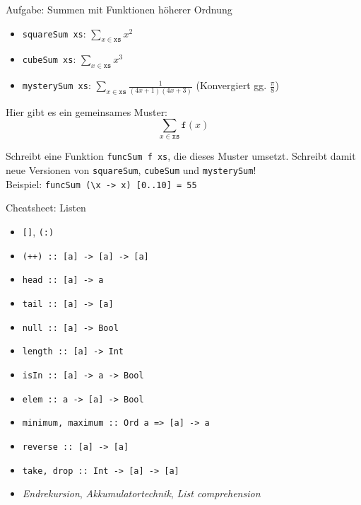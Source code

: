 \documentclass{beamer}
\begin{document}
\begin{frame}{Aufgabe: Summen mit Funktionen höherer Ordnung}
  \begin{itemize}
    \item \texttt{squareSum xs}: $\sum\limits_{x \in \texttt{xs}} x^2$
    \item \texttt{cubeSum xs}: $\sum\limits_{x \in \texttt{xs}} x^3$
    \item \texttt{mysterySum xs}: $\sum\limits_{x \in \texttt{xs}} \frac{1}{(4x + 1)(4x + 3)}$ (Konvergiert gg. $\frac{\pi}{8}$)
  \end{itemize}

  Hier gibt es ein gemeinsames Muster:
  \pause
  $$
  \sum\limits_{x \in \texttt{xs}} \texttt{f}(x)
  $$

  Schreibt eine Funktion \texttt{funcSum f xs}, die dieses Muster umsetzt. Schreibt damit neue Versionen von \texttt{squareSum}, \texttt{cubeSum} und \texttt{mysterySum}!\\
  Beispiel: \texttt{funcSum (\textbackslash{}x -> x) [0..10] = 55}
\end{frame}

\begin{frame}{Cheatsheet: Listen}
        \begin{itemize}
          \item \texttt{[]}, \texttt{(:)}
          \item \texttt{(++) :: [a] -> [a] -> [a]}
          \item \texttt{head :: [a] -> a}
          \item \texttt{tail :: [a] -> [a]}
          \item \texttt{null :: [a] -> Bool}
          \item \texttt{length :: [a] -> Int}
          \item \texttt{isIn :: [a] -> a -> Bool}
          \item \texttt{elem :: a -> [a] -> Bool}
          \item \texttt{minimum, maximum :: Ord a => [a] -> a}
          \item \texttt{reverse :: [a] -> [a]}
          \item \texttt{take, drop :: Int -> [a] -> [a]}
          \item \emph{Endrekursion}, \emph{Akkumulatortechnik}, \emph{List comprehension}
        \end{itemize}
\end{frame}
\end{document}
